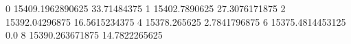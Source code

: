 0 15409.1962890625 33.71484375
1 15402.7890625 27.3076171875
2 15392.04296875 16.5615234375
4 15378.265625 2.7841796875
6 15375.4814453125 0.0
8 15390.263671875 14.7822265625
